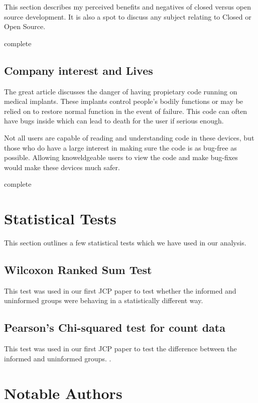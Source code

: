 \documentclass{article}
\newcommand{\complete}{
	\gls{complete}
}
\begin{document}
This section describes my perceived benefits and negatives of closed versus open source development. It is also a spot to discuss any subject relating to Closed or Open Source.

\complete

\subsection{Company interest and Lives}

The great article \cite{killed-by-code} discusses the danger of having propietary code running on medical implants. These implants control people's bodily functions or may be relied on to restore normal function in the event of failure. This code can often have bugs inside which can lead to death for the user if serious enough.

Not all users are capable of reading and understanding code in these devices, but those who do have a large interest in making sure the code is as bug-free as possible. Allowing knoweldgeable users to view the code and make bug-fixes would make these devices much safer.

\complete

\section{Statistical Tests}

This section outlines a few statistical tests which we have used in our analysis.

\subsection{Wilcoxon Ranked Sum Test}

This test was used in our first JCP paper to test whether the informed and uninformed groups were behaving in a statistically different way. \cite{doi:10.1080/01621459.1972.10481279,R-wilcoxon-test}

\subsection{Pearson's Chi-squared test for count data}

This test was used in our first JCP paper to test the difference between the informed and uninformed groups. \cite{10.2307/2984263,R-pearson-chisquare}.

\section{Notable Authors}
\end{document}
